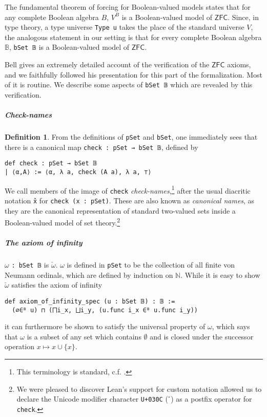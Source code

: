 \documentclass[a4paper,USenglish,cleveref, autoref]{lipics-v2019}
\newcommand{\B}{\mathbb{B}}
\newcommand{\lil}{\lstinline}
\theoremstyle{theorem}
\theoremstyle{definition}
\newtheorem{defn}[definition]{Definition}
\begin{document}
The fundamental theorem of forcing for Boolean-valued models \cite{hamkins2012well} states that for any complete Boolean algebra $B$, $V^B$ is a Boolean-valued model of $\mathsf{ZFC}$. Since, in type theory, a type universe \lstinline{Type u} takes the place of the standard universe $V$, the analogous statement in our setting is that for every complete Boolean algebra $\B$, \lstinline{bSet 𝔹} is a Boolean-valued model of $\mathsf{ZFC}$.

Bell \cite{bell2011set} gives an extremely detailed account of the verification of the $\mathsf{ZFC}$ axioms, and we faithfully followed his presentation for this part of the formalization. Most of it is routine. We describe some aspects of \lil{bSet 𝔹} which are revealed by this verification.

\subparagraph*{Check-names}
\begin{defn}\label{def-check}
  From the definitions of \lil{pSet} and \lil{bSet}, one immediately sees that there is a canonical map \lil{check : pSet → bSet 𝔹}, defined by
 \begin{lstlisting}
def check : pSet → bSet 𝔹
| ⟨α,A⟩ := ⟨α, λ a, check (A a), λ a, ⊤⟩
\end{lstlisting} We call members of the image of \lil{check} \emph{check-names},\footnote{This terminology is standard, c.f. \cite{hamkins2012well, moore2019method}.} after the usual diacritic notation \lstinline{x̌} for \lil{check (x : pSet)}. These are also known as \emph{canonical names}, as they are the canonical representation of standard two-valued sets inside a Boolean-valued model of set theory.\footnote{We were pleased to discover Lean's support for custom notation allowed us to declare the Unicode modifier character \texttt{U+030C} ($\check{\hspace{1mm}}$) as a postfix operator for \texttt{check}.}
\end{defn}

\subparagraph*{The axiom of infinity}
$\omega$ \lil{: bSet 𝔹} is $\check{\omega}$. $\omega$ is defined in \lil{pSet} to be the collection of all finite von Neumann ordinals, which are defined by induction on $\mathbb{N}$. While it is easy to show $\check{\omega}$ satisfies the axiom of infinity
\begin{lstlisting}
def axiom_of_infinity_spec (u : bSet 𝔹) : 𝔹 :=
  (∅∈ᴮ u) ⊓ (⨅i_x, ⨆i_y, (u.func i_x ∈ᴮ u.func i_y))
\end{lstlisting}
it can furthermore be shown to satisfy the universal property of $\omega$, which says that $\omega$ is a subset of any set which contains $\emptyset$ and is closed under the successor operation $x \mapsto x \cup \{x\}$.
\end{document}
